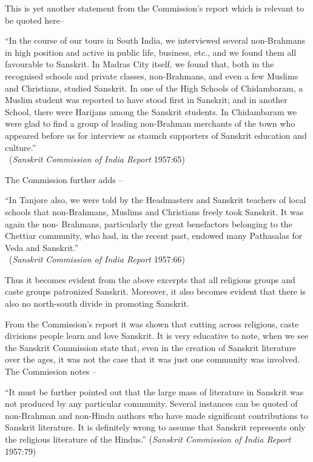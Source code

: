 This is yet another statement from the Commission’s report which is relevant to be quoted here–
\begin{myquote}
\eleven
“In the course of our tours in South India, we interviewed several non-Brahmans in high position and active in public life, business, etc., and we found them all favourable to Sanskrit. In Madras City itself, we found that, both in the recognised schools and private classes, non-Brahmans, and even a few Muslims and Christians, studied Sanskrit. In one of the High Schools of Chidambaram, a Muslim student was reported to have stood first in Sanskrit; and in another School, there were Harijans among the Sanskrit students. In Chidambaram we were glad to find a group of leading non-Brahman merchants of the town who appeared before us for interview as staunch supporters of Sanskrit education and culture.”\\[-15pt] 

~\hfill({\sl Sanskrit Commission of India Report} 1957:65)
\end{myquote}

The Commission further adds –
\begin{myquote}
\eleven
“In Tanjore also, we were told by the Headmasters and Sanskrit teachers of local schools that non-Brahmans, Muslims and Christians freely took Sanskrit. It was again the non- Brahmans, particularly the great benefactors belonging to the Chettiar community, who had, in the recent past, endowed many Pathasalas for Veda and Sanskrit.”\\[-15pt] 

~\hfill ({\sl Sanskrit Commission of India Report} 1957:66)
\end{myquote}

Thus it becomes evident from the above excerpts that all religious groups and caste groups patronized Sanskrit. Moreover, it also becomes evident that there is also no north-south divide in promoting Sanskrit. 

From the Commission’s report it was shown that cutting across religious, caste divisions people learn and love Sanskrit. It is very educative to note, when we see the Sanskrit Commission state that, even in the creation of Sanskrit literature over the ages, it was not the case that it was just one community was involved. The Commission notes –
\begin{myquote}
\eleven
“It must be further pointed out that the large mass of literature in Sanskrit was not produced by any particular community. Several instances can be quoted of non-Brahman and non-Hindu authors who have made significant contributions to Sanskrit literature. It is definitely wrong to assume that Sanskrit represents only the religious literature of the Hindus.”  \hfill ({\sl Sanskrit Commission of India Report} 1957:79)
\end{myquote}

